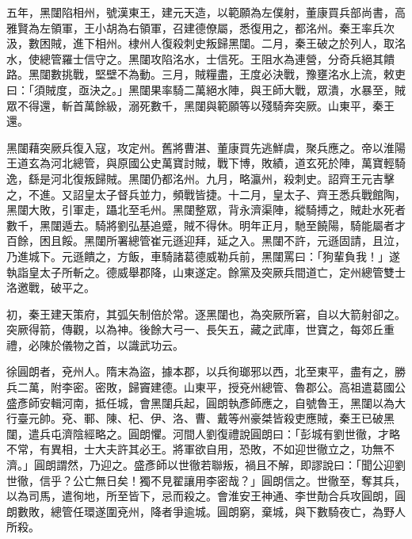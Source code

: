 \begin{pinyinscope}
 五年，黑闥陷相州，號漢東王，建元天造，以範願為左僕射，董康買兵部尚書，高雅賢為左領軍，王小胡為右領軍，召建德僚屬，悉復用之，都洺州。秦王率兵次汲，數困賊，進下相州。棣州人復殺刺史叛歸黑闥。二月，秦王破之於列人，取洺水，使總管羅士信守之。黑闥攻陷洺水，士信死。王阻水為連營，分奇兵絕其饋路。黑闥數挑戰，堅壁不為動。三月，賊糧盡，王度必決戰，豫壅洺水上流，敕吏曰：「須賊度，亟決之。」黑闥果率騎二萬絕水陣，與王師大戰，眾潰，水暴至，賊眾不得還，斬首萬餘級，溺死數千，黑闥與範願等以殘騎奔突厥。山東平，秦王還。



 黑闥藉突厥兵復入寇，攻定州。舊將曹湛、董康買先逃鮮虞，聚兵應之。帝以淮陽王道玄為河北總管，與原國公史萬寶討賊，戰下博，敗績，道玄死於陣，萬寶輕騎逸，繇是河北復叛歸賊。黑闥仍都洺州。九月，略瀛州，殺刺史。詔齊王元吉擊之，不進。又詔皇太子督兵並力，頻戰皆捷。十二月，皇太子、齊王悉兵戰館陶，黑闥大敗，引軍走，躡北至毛州。黑闥整眾，背永濟渠陣，縱騎搏之，賊赴水死者數千，黑闥遁去。騎將劉弘基追蹙，賊不得休。明年正月，馳至饒陽，騎能屬者才百餘，困且餒。黑闥所署總管崔元遜迎拜，延之入。黑闥不許，元遜固請，且泣，乃進城下。元遜饋之，方飯，車騎諸葛德威勒兵前，黑闥罵曰：「狗輩負我！」遂執詣皇太子所斬之。德威舉郡降，山東遂定。餘黨及突厥兵間道亡，定州總管雙士洛邀戰，破平之。



 初，秦王建天策府，其弧矢制倍於常。逐黑闥也，為突厥所窘，自以大箭射卻之。突厥得箭，傳觀，以為神。後餘大弓一、長矢五，藏之武庫，世寶之，每郊丘重禮，必陳於儀物之首，以識武功云。



 徐圓朗者，兗州人。隋末為盜，據本郡，以兵徇瑯邪以西，北至東平，盡有之，勝兵二萬，附李密。密敗，歸竇建德。山東平，授兗州總管、魯郡公。高祖遣葛國公盛彥師安輯河南，抵任城，會黑闥兵起，圓朗執彥師應之，自號魯王，黑闥以為大行臺元帥。兗、鄆、陳、杞、伊、洛、曹、戴等州豪桀皆殺吏應賊，秦王已破黑闥，遣兵屯濟陰經略之。圓朗懼。河間人劉復禮說圓朗曰：「彭城有劉世徹，才略不常，有異相，士大夫許其必王。將軍欲自用，恐敗，不如迎世徹立之，功無不濟。」圓朗謂然，乃迎之。盛彥師以世徹若聯叛，禍且不解，即謬說曰：「聞公迎劉世徹，信乎？公亡無日矣！獨不見翟讓用李密哉？」圓朗信之。世徹至，奪其兵，以為司馬，遣徇地，所至皆下，忌而殺之。會淮安王神通、李世勣合兵攻圓朗，圓朗數敗，總管任環遂圍兗州，降者爭逾城。圓朗窮，棄城，與下數騎夜亡，為野人所殺。



\end{pinyinscope}